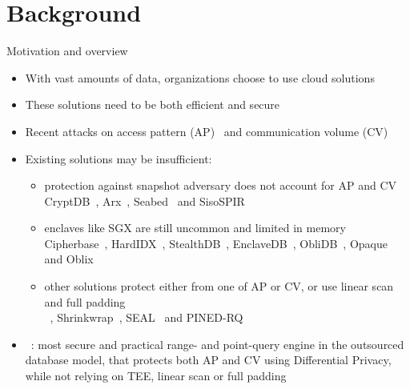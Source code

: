
\newlength{\listLabelLength}

\section{Background}

	\begin{frame}{Motivation and overview}

		\begin{itemize}
			\item<1-> With vast amounts of data, organizations choose to use cloud solutions
			\item<1-> These solutions need to be both efficient and secure
			\item<2-> Recent attacks on access pattern (AP)~\cite{multidimensional-range-queries, inference-attack-islam-14, leakage-abuse-attacks-cash-15, inference-attacks-naveed-15, generic-attacks-kellaris, attacks-tao-of-inference, grubbs-attacks, access-pattern-disclosure, attacks-improved-reconstruction} and communication volume (CV)~\cite{generic-attacks-kellaris, state-of-uniform, attacks-improved-reconstruction, pump-volume-attacks, volume-range-attacks}
			\item<3->
				Existing solutions may be insufficient:
				\begin{itemize}
					\item<1,2,3,6-> \normalsize
						protection against snapshot adversary does not account for AP and CV \\
						\small{CryptDB~\cite{crypt-db}, Arx~\cite{arx}, Seabed~\cite{seabed} and SisoSPIR~\cite{sisospir}}

					\item<1,2,4,6-> \normalsize
						enclaves like SGX are still uncommon and limited in memory \\
						\small{Cipherbase~\cite{cipherbase}, HardIDX~\cite{hardidx}, StealthDB~\cite{stealth-db}, EnclaveDB~\cite{enclave-db}, ObliDB~\cite{oblidb}, Opaque~\cite{opaque} and Oblix~\cite{oblix}}

					\item<1,2,5,6-> \normalsize
						other solutions protect either from one of AP or CV, or use linear scan and full padding \\
						\small{\crypte~\cite{crypte}, Shrinkwrap~\cite{shrinkwrap}, SEAL~\cite{seal} and PINED-RQ~\cite{pined-rq}}
				\end{itemize}
			\item<6-> \epsolute~\cite{epsolute}: most secure and practical range- and point-query engine in the outsourced database model, that protects both AP and CV using Differential Privacy, while not relying on TEE, linear scan or full padding
		\end{itemize}

	\end{frame}


